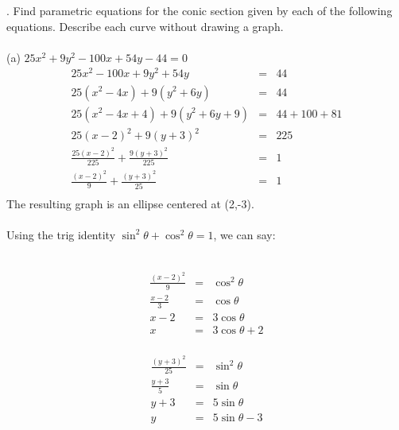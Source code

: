 \documentclass[11pt]{exam}
\begin{document}
. Find parametric equations for the conic section given by each of the following equations. Describe each curve without drawing a graph. \\
\\
\indent (a) $ 25x^2+9y^2-100x+54y-44=0 $\\
\begin{eqnarray*}
25x^2-100x+9y^2+54y &=& 44\\
25(x^2-4x) + 9(y^2+6y) &=& 44\\
25(x^2-4x+4) + 9(y^2+6y+9) &=& 44+100+81\\
25(x-2)^2 + 9(y+3)^2 &=& 225\\
\frac{25(x-2)^2}{225}+\frac{9(y+3)^2}{225}&=&1\\
\frac{(x-2)^2}{9}+\frac{(y+3)^2}{25}&=&1\\
\end{eqnarray*}
The resulting graph is an ellipse centered at (2,-3).\\
\\
Using the trig identity $\sin^2 \theta + \cos^2 \theta = 1$, we can say:\\
\\
\noindent\begin{minipage}{.5\linewidth}
\begin{eqnarray*}
  \frac{(x-2)^2}{9}&=&\cos^2 \theta\\
  \frac{x-2}{3}&=&\cos \theta\\
  x-2 &=& 3\cos \theta\\
  x &=& 3\cos \theta + 2\\
\end{eqnarray*}
\end{minipage}%
\begin{minipage}{.5\linewidth}
\begin{eqnarray*}
  \frac{(y+3)^2}{25}&=&\sin^2 \theta\\
  \frac{y+3}{5}&=&\sin \theta\\
  y+3 &=& 5\sin \theta\\
  y &=& 5\sin \theta -3\\
\end{eqnarray*}
\end{minipage}
\end{document}
